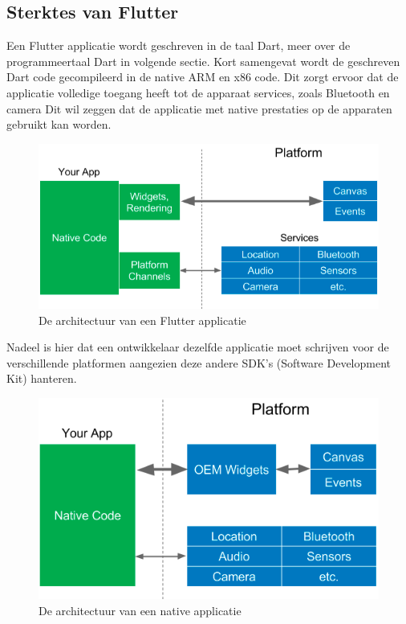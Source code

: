 \subsection{Sterktes van Flutter}
Een Flutter applicatie wordt geschreven in de taal Dart, meer over de programmeertaal Dart in volgende sectie. Kort samengevat wordt de geschreven Dart code gecompileerd in de native ARM en x86 code. 
Dit zorgt ervoor dat de applicatie volledige toegang heeft tot de apparaat services, zoals Bluetooth en camera
Dit wil zeggen dat de applicatie met native prestaties op de apparaten gebruikt kan worden.


\begin{figure}
    \includegraphics[width=\linewidth]{img/stand-van-zaken/flutter-app-architecture.png}
    \caption{De architectuur van een Flutter applicatie}
    \label{fig:flutter-app-architecture}
\end{figure}

Nadeel is hier dat een ontwikkelaar dezelfde applicatie moet schrijven voor de verschillende platformen aangezien deze andere SDK's (Software Development Kit) hanteren. \autocite{Coninck2019}
\begin{figure}
    \includegraphics[width=\linewidth]{img/stand-van-zaken/native-app-architecture.png}
    \caption{De architectuur van een native applicatie}
    \label{fig:flutter-app-architecture}
\end{figure}

